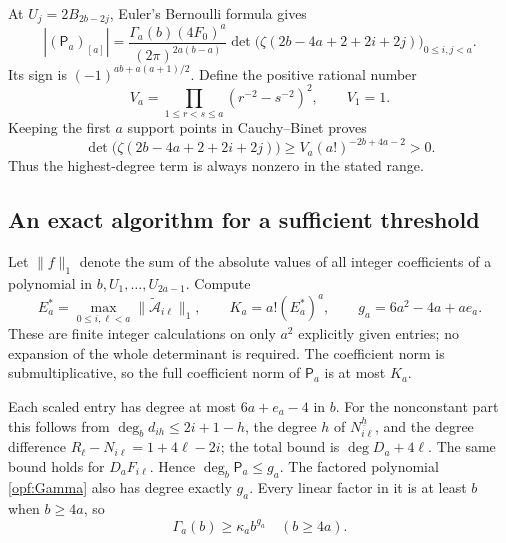At $U_j=2B_{2b-2j}$, Euler's Bernoulli formula gives
\begin{equation}\label{opf:actual-leading}
 \left|(\mathsf P_a)_{[a]}\right|
 =\frac{\Gamma_a(b)(4F_0)^a}{(2\pi)^{2a(b-a)}}
   \det\bigl(\zeta(2b-4a+2+2i+2j)\bigr)_{0\le i,j<a}.
\end{equation}
Its sign is $(-1)^{ab+a(a+1)/2}$. Define the positive rational
number
\[
 V_a=\prod_{1\le r<s\le a}(r^{-2}-s^{-2})^2,
 \qquad V_1=1.
\]
Keeping the first $a$ support points in Cauchy--Binet proves
\begin{equation}\label{opf:moment-lower}
 \det\bigl(\zeta(2b-4a+2+2i+2j)\bigr)
       \ge V_a(a!)^{-2b+4a-2}>0.
\end{equation}
Thus the highest-degree term is always nonzero in the stated range.

\subsection{An exact algorithm for a sufficient threshold}

Let $\|f\|_1$ denote the sum of the absolute values of all integer
coefficients of a polynomial in $b,U_1,\ldots,U_{2a-1}$. Compute
\[
 E_a^*=\max_{0\le i,\ell<a}\|
                  \widetilde{\mathcal A}_{i\ell}\|_1,
 \qquad K_a=a!(E_a^*)^a,
 \qquad g_a=6a^2-4a+ae_a.
\]
These are finite integer calculations on only $a^2$ explicitly given
entries; no expansion of the whole determinant is required.
The coefficient norm is submultiplicative, so the full coefficient
norm of $\mathsf P_a$ is at most $K_a$.

Each scaled entry has degree at most $6a+e_a-4$ in $b$.
For the nonconstant part this follows from
$\deg_b d_{ih}\le2i+1-h$, the degree $h$ of
$N_{i\ell}^{\underline h}$, and the degree difference
$R_\ell-N_{i\ell}=1+4\ell-2i$; the total bound is
$\deg D_a+4\ell$. The same bound holds for $D_aF_{i\ell}$.
Hence $\deg_b\mathsf P_a\le g_a$.
The factored polynomial \eqref{opf:Gamma} also has degree exactly
$g_a$. Every linear factor in it is at least $b$ when $b\ge4a$,
so
\[
 \Gamma_a(b)\ge\kappa_a b^{g_a}\quad(b\ge4a).
\]

